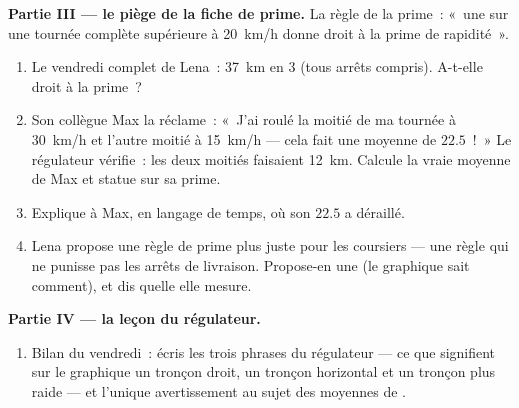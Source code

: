\begin{problem}
\medskip\noindent\textbf{Partie III --- le piège de la fiche de
prime.}
La règle de la prime~: «~une  sur une tournée
complète supérieure à \qty{20}{km/h} donne droit à la prime de
rapidité~».
\begin{enumerate}[resume]
  \item Le vendredi complet de Lena~: \qty{37}{km} en $3$ 
        (tous arrêts compris). A-t-elle droit à la prime~?
  \item Son collègue Max la réclame~: «~J'ai roulé la moitié de ma
        tournée à \qty{30}{km/h} et l'autre moitié à
        \qty{15}{km/h} --- cela fait une moyenne de $22.5$~!~» Le
        régulateur vérifie~: les deux moitiés faisaient
        \qty{12}{km}. Calcule la vraie moyenne de Max et statue sur
        sa prime.
  \item Explique à Max, en langage de temps, où son $22.5$ a
        déraillé.
  \item Lena propose une règle de prime plus juste pour les
        coursiers --- une règle qui ne punisse pas les arrêts de
        livraison. Propose-en une (le graphique sait comment), et
        dis quelle  elle mesure.
\end{enumerate}

\medskip\noindent\textbf{Partie IV --- la leçon du régulateur.}
\begin{enumerate}[resume]
  \item Bilan du vendredi~: écris les trois phrases du régulateur
        --- ce que signifient sur le graphique un tronçon droit, un
        tronçon horizontal et un tronçon plus raide --- et l'unique
        avertissement au sujet des moyennes de .
\end{enumerate}
\end{problem}
